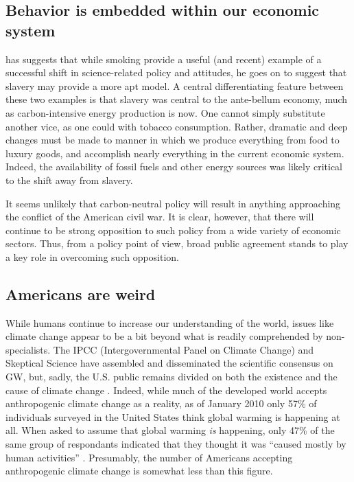 \subsection{Behavior is embedded within our economic system}

\textcite{hoffman_climate_2010} has suggests that while smoking provide a useful
(and recent) example of a successful shift in science-related policy and
attitudes, he goes on to suggest that slavery may provide a more apt model. A
central differentiating feature between these two examples is that slavery was
central to the ante-bellum economy, much as carbon-intensive energy production
is now.  One cannot simply substitute another vice, as one could with tobacco
consumption.  Rather, dramatic and deep changes must be made to manner in which
we produce everything from food to luxury goods, and accomplish nearly
everything in the current economic system. Indeed, the availability of fossil
fuels and other energy sources was likely critical to the shift away from
slavery.

It seems unlikely that carbon-neutral policy will result in anything approaching
the conflict of the American civil war. It is clear, however, that there will
continue to be strong opposition to such policy from a wide variety of economic
sectors. Thus, from a policy point of view, broad public agreement stands to
play a key role in overcoming such opposition.

\subsection{Americans are weird}

While humans continue to increase our understanding of the world, issues like
climate change appear to be a bit beyond what is readily comprehended by
non-specialists. The IPCC (Intergovernmental Panel on Climate Change) and Skeptical Science have
assembled and disseminated the scientific consensus on GW, but, sadly, the U.S.
public remains divided on both the existence and the cause of climate change
\parencite[cf.][]{hoffman_growing_2011}. Indeed, while much of the
developed world accepts anthropogenic climate change as a reality, as of January
2010 only 57\% of individuals surveyed in the United States think global warming
is happening at all. When asked to assume that global warming \emph{is}
happening, only 47\% of the same group of respondants indicated that they
thought it was ``caused mostly by human activities'' \cite[Q47 and Q50
in][]{leiserowitz_climate_2010}.  Presumably, the number of Americans accepting
anthropogenic climate change is somewhat less than this figure. 

